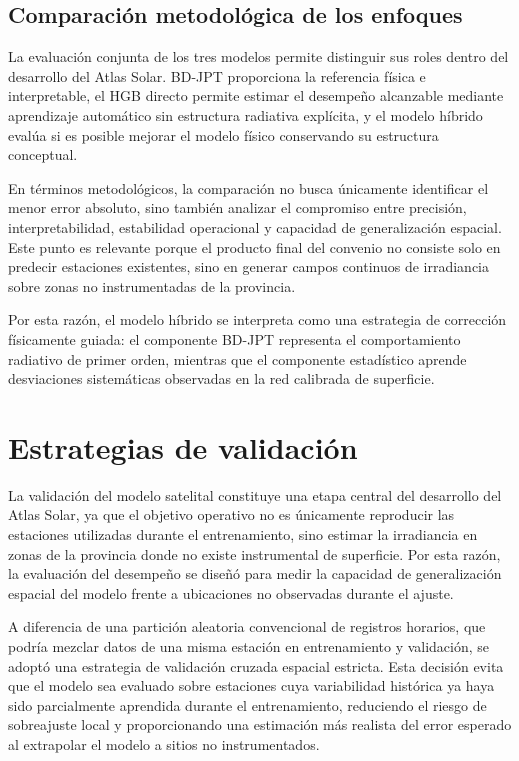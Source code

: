 \documentclass[../main.tex]{subfiles}
\begin{document}
\subsection{Comparación metodológica de los enfoques}

La evaluación conjunta de los tres modelos permite distinguir sus roles dentro del desarrollo del Atlas Solar. BD-JPT proporciona la referencia física e interpretable, el HGB directo permite estimar el desempeño alcanzable mediante aprendizaje automático sin estructura radiativa explícita, y el modelo híbrido evalúa si es posible mejorar el modelo físico conservando su estructura conceptual.

En términos metodológicos, la comparación no busca únicamente identificar el menor error absoluto, sino también analizar el compromiso entre precisión, interpretabilidad, estabilidad operacional y capacidad de generalización espacial. Este punto es relevante porque el producto final del convenio no consiste solo en predecir estaciones existentes, sino en generar campos continuos de irradiancia sobre zonas no instrumentadas de la provincia.

Por esta razón, el modelo híbrido se interpreta como una estrategia de corrección físicamente guiada: el componente BD-JPT representa el comportamiento radiativo de primer orden, mientras que el componente estadístico aprende desviaciones sistemáticas observadas en la red calibrada de superficie.


\section{Estrategias de validación}

La validación del modelo satelital constituye una etapa central del desarrollo del Atlas Solar, ya que el objetivo operativo no es únicamente reproducir las estaciones utilizadas durante el entrenamiento, sino estimar la irradiancia en zonas de la provincia donde no existe instrumental de superficie. Por esta razón, la evaluación del desempeño se diseñó para medir la capacidad de generalización espacial del modelo frente a ubicaciones no observadas durante el ajuste.

A diferencia de una partición aleatoria convencional de registros horarios, que podría mezclar datos de una misma estación en entrenamiento y validación, se adoptó una estrategia de validación cruzada espacial estricta. Esta decisión evita que el modelo sea evaluado sobre estaciones cuya variabilidad histórica ya haya sido parcialmente aprendida durante el entrenamiento, reduciendo el riesgo de sobreajuste local y proporcionando una estimación más realista del error esperado al extrapolar el modelo a sitios no instrumentados.
\end{document}
